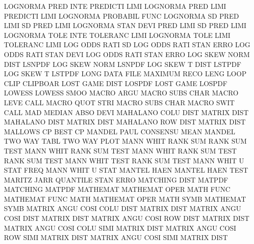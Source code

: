 LOGNORMA PRED INTE                      PREDICTI LIMI
LOGNORMA PRED LIMI                      PREDICTI LIMI
LOGNORMA                                PROBABIL FUNC
LOGNORMA SD   PRED LIMI                 SD       PRED LIMI
LOGNORMA STAN DEVI PRED LIMI            SD       PRED LIMI
LOGNORMA TOLE INTE                      TOLERANC LIMI
LOGNORMA TOLE LIMI                      TOLERANC LIMI
LOG      ODDS RATI SD                   LOG      ODDS RATI STAN ERRO
LOG      ODDS RATI STAN DEVI            LOG      ODDS RATI STAN ERRO
LOG      SKEW NORM DIST                 LSNPDF
LOG      SKEW NORM                      LSNPDF
LOG      SKEW T    DIST                 LSTPDF
LOG      SKEW T                         LSTPDF
LONG     DATA FILE                      MAXIMUM  RECO LENG
LOOP     CLIP                           CLIPBOAR
LOST     GAME DIST                      LOSPDF
LOST     GAME                           LOSPDF
LOWESS                                  LOWESS   SMOO
MACRO    ARGU                           MACRO    SUBS CHAR
MACRO    LEVE                           CALL
MACRO    QUOT STRI                      MACRO    SUBS CHAR
MACRO    SWIT                           CALL
MAD                                     MEDIAN   ABSO DEVI
MAHALANO COLU DIST                      MATRIX   DIST
MAHALANO DIST                           MATRIX   DIST
MAHALANO ROW  DIST                      MATRIX   DIST
MALLOWS  CP                             BEST     CP
MANDEL   PAUL                           CONSENSU MEAN
MANDEL   TWO  WAY  TABL                 TWO      WAY  PLOT
MANN     WHIT RANK SUM                  RANK     SUM  TEST
MANN     WHIT                           RANK     SUM  TEST
MANN     WHIT RANK SUM  TEST            RANK     SUM  TEST
MANN     WHIT TEST                      RANK     SUM  TEST
MANN     WHIT U    STAT FREQ            MANN     WHIT U    STAT
MANTEL   HAEN                           MANTEL   HAEN TEST
MARITZ   JARR                           QUANTILE STAN ERRO
MATCHING DIST                           MATPDF
MATCHING                                MATPDF
MATHEMAT                                MATHEMAT OPER
MATH     FUNC                           MATHEMAT FUNC
MATH                                    MATHEMAT OPER
MATH     SYMB                           MATHEMAT SYMB
MATRIX   ANGU COSI COLU DIST            MATRIX   DIST
MATRIX   ANGU COSI DIST                 MATRIX   DIST
MATRIX   ANGU COSI ROW  DIST            MATRIX   DIST
MATRIX   ANGU COSI COLU SIMI            MATRIX   DIST
MATRIX   ANGU COSI ROW  SIMI            MATRIX   DIST
MATRIX   ANGU COSI SIMI                 MATRIX   DIST
